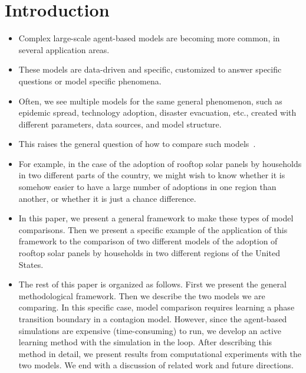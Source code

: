 \section{Introduction}

\begin{itemize}
    \item Complex large-scale agent-based models are becoming more common, in several application areas.
    \item These models are data-driven and specific, customized to answer specific questions or model specific phenomena.
    \item Often, we see multiple models for the same general phenomenon, such as epidemic spread, technology adoption, disaster evacuation, etc., created with different parameters, data sources, and model structure.
    \item This raises the general question of how to compare such models~\cite{axtell96aligning,burton99validation}.
    \item For example, in the case of the adoption of rooftop solar panels by households in two different parts of the country, we might wish to know whether it is somehow easier to have a large number of adoptions in one region than another, or whether it is just a chance difference.
    \item In this paper, we present a general framework to make these types of model comparisons. Then we present a specific example of the application of this framework to the comparison of two different models of the adoption of rooftop solar panels by households in two different regions of the United States.
    \item The rest of this paper is organized as follows. First we present the general methodological framework. Then we describe the two models we are comparing. In this specific case, model comparison requires learning a phase transition boundary in a contagion model. However, since the agent-based simulations are expensive (time-consuming) to run, we develop an active learning method with the simulation in the loop. After describing this method in detail, we present results from computational experiments with the two models. We end with a discussion of related work and future directions.
\end{itemize}